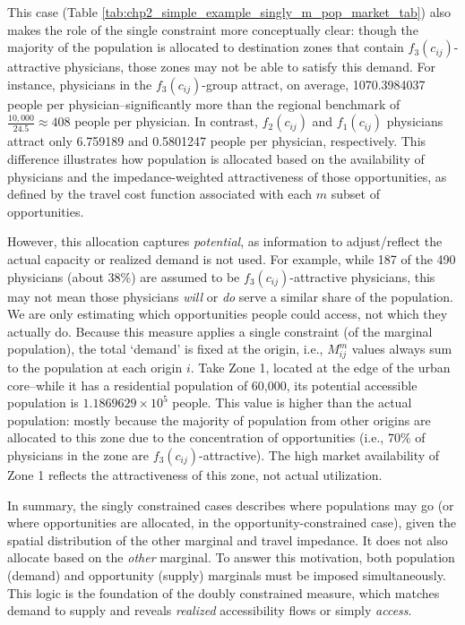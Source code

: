 \documentclass[
11pt, %
oneside, %
english, %
singlespacing, %
]{macthesis} %
\begin{document}


This case (Table \ref{tab:chp2_simple_example_singly_m_pop_market_tab}) also makes the role of the single constraint more conceptually clear: though the majority of the population is allocated to destination zones that contain \(f_3(c_{ij})\)-attractive physicians, those zones may not be able to satisfy this demand. For instance, physicians in the \(f_3(c_{ij})\)-group attract, on average, 1070.3984037 people per physician--significantly more than the regional benchmark of \(\frac{10,000}{24.5} \approx 408\) people per physician. In contrast, \(f_2(c_{ij})\) and \(f_1(c_{ij})\) physicians attract only 6.759189 and 0.5801247 people per physician, respectively. This difference illustrates how population is allocated based on the availability of physicians and the impedance-weighted attractiveness of those opportunities, as defined by the travel cost function associated with each \(m\) subset of opportunities.

However, this allocation captures \emph{potential}, as information to adjust/reflect the actual capacity or realized demand is not used. For example, while 187 of the 490 physicians (about 38\%) are assumed to be \(f_3(c_{ij})\)-attractive physicians, this may not mean those physicians \emph{will} or \emph{do} serve a similar share of the population. We are only estimating which opportunities people could access, not which they actually do. Because this measure applies a single constraint (of the marginal population), the total `demand' is fixed at the origin, i.e., \(M_{ij}^m\) values always sum to the population at each origin \(i\). Take Zone 1, located at the edge of the urban core--while it has a residential population of 60,000, its potential accessible population is \ensuremath{1.1869629\times 10^{5}} people. This value is higher than the actual population: mostly because the majority of population from other origins are allocated to this zone due to the concentration of opportunities (i.e., 70\% of physicians in the zone are \(f_3(c_{ij})\)-attractive). The high market availability of Zone 1 reflects the attractiveness of this zone, not actual utilization.

In summary, the singly constrained cases describes where populations may go (or where opportunities are allocated, in the opportunity-constrained case), given the spatial distribution of the other marginal and travel impedance. It does not also allocate based on the \emph{other} marginal. To answer this motivation, both population (demand) and opportunity (supply) marginals must be imposed simultaneously. This logic is the foundation of the doubly constrained measure, which matches demand to supply and reveals \emph{realized} accessibility flows or simply \emph{access}.
\end{document}

